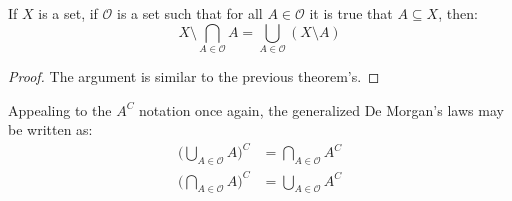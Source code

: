             \begin{theorem}
                If $X$ is a set, if $\mathcal{O}$ is a set such that for all
                $A\in\mathcal{O}$ it is true that $A\subseteq{X}$, then:
                \begin{equation}
                    X\setminus\bigcap_{A\in\mathcal{O}}A=
                        \bigcup_{A\in\mathcal{O}}(X\setminus{A})
                \end{equation}
            \end{theorem}
            \begin{proof}
                The argument is similar to the previous theorem's.
            \end{proof}
            Appealing to the $A^{C}$ notation once again, the generalized
            De Morgan's laws may be written as:
            \begin{align}
                \Big(\bigcup_{A\in\mathcal{O}}A\Big)^{C}
                    &=\bigcap_{A\in\mathcal{O}}A^{C}\\
                \Big(\bigcap_{A\in\mathcal{O}}A\Big)^{C}
                    &=\bigcup_{A\in\mathcal{O}}A^{C}
            \end{align}
